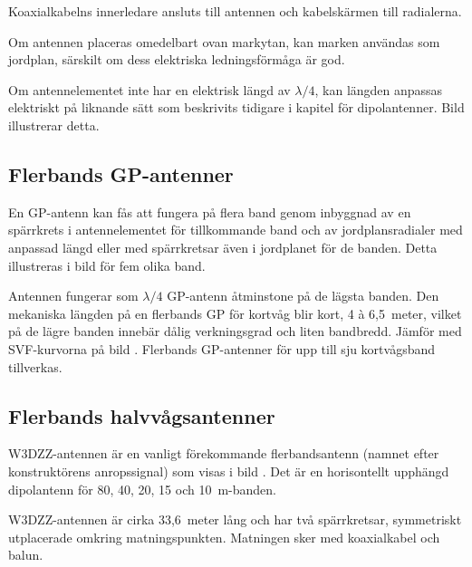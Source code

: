 Koaxialkabelns innerledare ansluts till antennen och kabelskärmen till
radialerna.

Om antennen placeras omedelbart ovan markytan, kan marken användas som
jordplan, särskilt om dess elektriska ledningsförmåga är god.

Om antennelementet inte har en elektrisk längd av \(\lambda/4\), kan
längden anpassas elektriskt på liknande sätt som beskrivits tidigare i
kapitel  för dipolantenner.
Bild  illustrerar detta.


\newpage
\subsection{Flerbands GP-antenner}

En GP-antenn kan fås att fungera på flera band genom inbyggnad av en spärrkrets
i antennelementet för tillkommande band och av jordplansradialer med anpassad
längd eller med spärrkretsar även i jordplanet för de banden.
Detta illustreras i bild  för fem olika band.

Antennen fungerar som \(\lambda/4\) GP-antenn åtminstone på de lägsta banden.
Den mekaniska längden på en flerbands GP för kortvåg blir kort, 4 à 6,5~meter,
vilket på de lägre banden innebär dålig verkningsgrad och liten bandbredd.
Jämför med SVF-kurvorna på bild .
Flerbands GP-antenner för upp till sju kortvågsband tillverkas.

\clearpage
\subsection{Flerbands halvvågsantenner}
\label{W3DZZ}


W3DZZ-antennen är en vanligt förekommande flerbandsantenn (namnet
efter konstruktörens anropssignal) som visas i bild .
Det är en horisontellt upphängd dipolantenn för 80, 40, 20, 15 och
10~m-banden.

W3DZZ-antennen är cirka 33,6~meter lång och har två spärrkretsar,
symmetriskt utplacerade omkring matningspunkten.
Matningen sker med koaxialkabel och balun.

